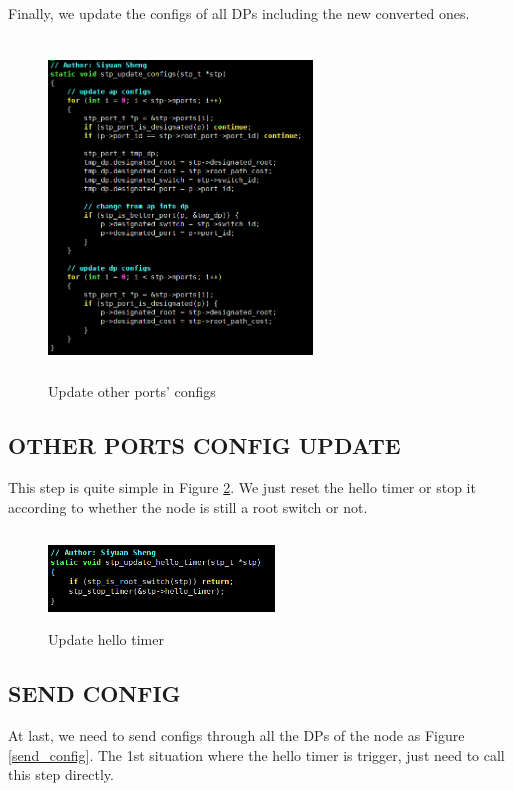 \documentclass{article}
\begin{document}
Finally, we update the configs of all DPs including the new converted ones.

\begin{figure}
	\centering
	\includegraphics[width=7cm, height=9cm]{update_configs.png}
	\caption{Update other ports' configs}
	\label{update_configs}
\end{figure}

\subsection{OTHER PORTS CONFIG UPDATE}

This step is quite simple in Figure \ref{update_hello_timer}.
We just reset the hello timer or stop it according to whether the node is still a root switch or not.

\begin{figure}
	\centering
	\includegraphics[width=6cm, height=2.5cm]{update_hello_timer.png}
	\caption{Update hello timer}
	\label{update_hello_timer}
\end{figure}

\subsection{SEND CONFIG}

At last, we need to send configs through all the DPs of the node as Figure \ref{send_config}. The 1st situation where the hello timer is trigger, just need to call this step directly.
\end{document}
